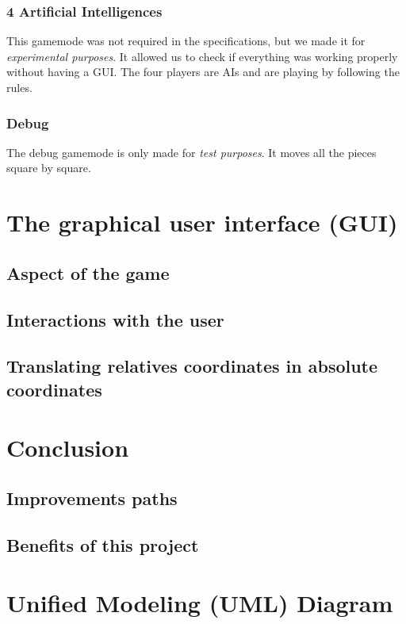 \documentclass[english, 11pt, titlepage]{article}
\begin{document}
    \subsubsection{4 Artificial Intelligences}
    This gamemode was not required in the specifications, but we made it for \emph{experimental purposes}. It allowed us to check if everything was working properly without having a GUI. The four players are AIs and are playing by following the rules.
    
    \subsubsection{Debug}
    The debug gamemode is only made for \emph{test purposes}. It moves all the pieces square by square.

    \section{The graphical user interface (GUI)}
    \subsection{Aspect of the game}
    \subsection{Interactions with the user}
    \subsection{Translating relatives coordinates in absolute coordinates}

    \section{Conclusion}
    \subsection{Improvements paths}
    \subsection{Benefits of this project}
    \label{section:translating_coordinates}

    \pagebreak
    \appendix
    \appendixpage
    \addappheadtotoc
    \section{Unified Modeling (UML) Diagram}
\end{document}
